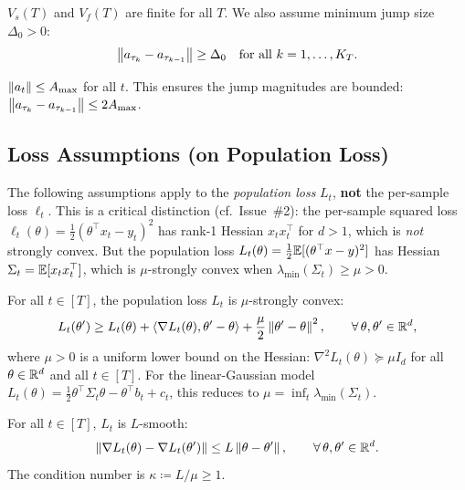 \begin{assumption}
\label{ass:bounded-variation}
$V_s(T)$ and $V_f(T)$ are finite for all $T$. We also assume
minimum jump size $\Delta_0 > 0$:
\[
  \left\|a_{\tau_k} - a_{\tau_{k-1}}\right\| \geq \Delta_0
  \quad \text{for all } k = 1, \ldots, K_T.
\]
\end{assumption}

\begin{assumption}
\label{ass:bounded-coeff}
$\left\|a_t\right\| \leq A_{\max}$ for all $t$. This ensures the jump magnitudes
are bounded: $\left\|a_{\tau_k} - a_{\tau_{k-1}}\right\| \leq 2A_{\max}$.
\end{assumption}

\subsection{Loss Assumptions (on Population Loss)}

The following assumptions apply to the \emph{population loss} $L_t$,
\textbf{not} the per-sample loss $\ell_t$. This is a critical distinction
(cf.\ Issue~\#2): the per-sample squared loss
$\ell_t(\theta) = \frac{1}{2}(\theta^\top x_t - y_t)^2$ has rank-1
Hessian $x_t x_t^\top$ for $d > 1$, which is \emph{not} strongly convex.
But the population loss $L_t(\theta) = \frac{1}{2}\mathbb{E}[(\theta^\top x - y)^2]$
has Hessian $\Sigma_t = \mathbb{E}[x_t x_t^\top]$, which is $\mu$-strongly convex
when $\lambda_{\min}(\Sigma_t) \geq \mu > 0$.

\begin{assumption}
\label{ass:strong-convexity}
For all $t \in [T]$, the population loss $L_t$ is $\mu$-strongly convex:
\[
  L_t(\theta') \geq L_t(\theta) + \langle \nabla L_t(\theta), \theta'-\theta \rangle
  + \frac{\mu}{2}\left\|\theta'-\theta\right\|^2,
  \qquad \forall\, \theta, \theta' \in \mathbb{R}^d,
\]
where $\mu > 0$ is a uniform lower bound on the Hessian:
$\nabla^2 L_t(\theta) \succeq \mu I_d$ for all $\theta \in \mathbb{R}^d$
and all $t \in [T]$.
For the linear-Gaussian model $L_t(\theta) = \frac{1}{2}\theta^\top
\Sigma_t\theta - \theta^\top b_t + c_t$, this reduces to
$\mu = \inf_t \lambda_{\min}(\Sigma_t)$.
\end{assumption}

\begin{assumption}
\label{ass:smoothness}
For all $t \in [T]$, $L_t$ is $L$-smooth:
\[
  \left\|\nabla L_t(\theta) - \nabla L_t(\theta')\right\| \leq L\left\|\theta - \theta'\right\|,
  \qquad \forall\, \theta, \theta' \in \mathbb{R}^d.
\]
The condition number is $\kappa \coloneqq L/\mu \geq 1$.
\end{assumption}

